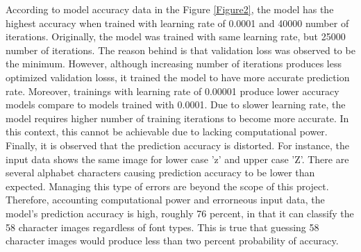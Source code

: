 According to model accuracy data in the Figure \ref{Figure2}, the model has the highest accuracy when trained
with learning rate of 0.0001 and 40000 number of iterations. Originally, the model was trained with same learning rate, but
25000 number of iterations. The reason behind is that validation loss was observed to be the minimum. However, although
increasing number of iterations produces less optimized validation losss, it trained the model to have more accurate
prediction rate.
\newline
\newline
\indent
Moreover, trainings with learning rate of 0.00001 produce lower accuracy models compare to models trained with 0.0001.
Due to slower learning rate, the model requires higher number of training iterations to become more accurate. In this
context, this cannot be achievable due to lacking computational power.
\newline
\newline
\indent
Finally, it is observed that the prediction accuracy is distorted. For instance, the input data shows the same image for
lower case 'z' and upper case 'Z'. There are several alphabet characters causing prediction accuracy to be lower than expected.
Managing this type of errors are beyond the scope of this project. Therefore, accounting computational power and errorneous input data,
the model's prediction accuracy is high, roughly 76 percent, in that it can classify the 58 character images regardless of font types.
This is true that guessing 58 character images would produce less than two percent probability of accuracy.



